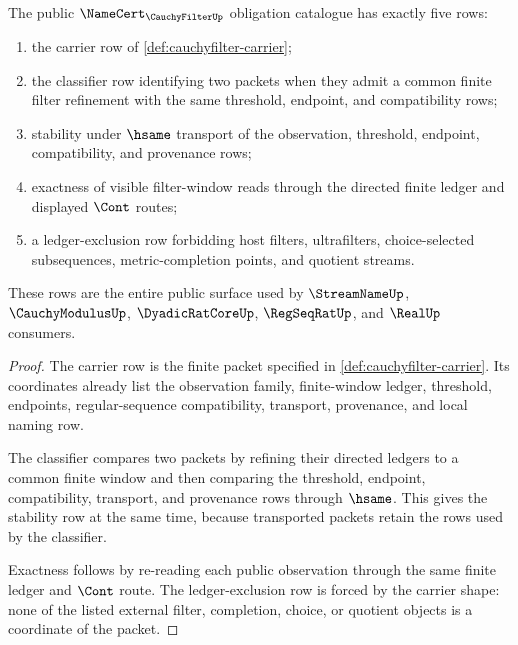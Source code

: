 \begin{theorem}\label{thm:cauchyfilter-public-obligation-catalogue}
The public $\NameCert_{\CauchyFilterUp}$ obligation catalogue has exactly five
rows:
\begin{enumerate}
\item the carrier row of \autoref{def:cauchyfilter-carrier};
\item the classifier row identifying two packets when they admit a common
finite filter refinement with the same threshold, endpoint, and compatibility
rows;
\item stability under $\hsame$ transport of the observation, threshold,
endpoint, compatibility, and provenance rows;
\item exactness of visible filter-window reads through the directed finite
ledger and displayed $\Cont$ routes;
\item a ledger-exclusion row forbidding host filters, ultrafilters,
choice-selected subsequences, metric-completion points, and quotient streams.
\end{enumerate}
These rows are the entire public surface used by $\StreamNameUp$,
$\CauchyModulusUp$, $\DyadicRatCoreUp$, $\RegSeqRatUp$, and $\RealUp$
consumers.
\end{theorem}
\begin{proof}
The carrier row is the finite packet specified in
\autoref{def:cauchyfilter-carrier}. Its coordinates already list the
observation family, finite-window ledger, threshold, endpoints,
regular-sequence compatibility, transport, provenance, and local naming row.

The classifier compares two packets by refining their directed ledgers to a
common finite window and then comparing the threshold, endpoint, compatibility,
transport, and provenance rows through $\hsame$. This gives the stability row
at the same time, because transported packets retain the rows used by the
classifier.

Exactness follows by re-reading each public observation through the same
finite ledger and $\Cont$ route. The ledger-exclusion row is forced by the
carrier shape: none of the listed external filter, completion, choice, or
quotient objects is a coordinate of the packet.
\end{proof}

